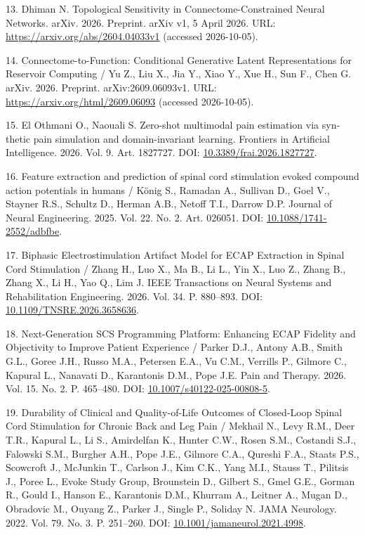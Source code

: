 \documentclass[12pt,a4paper]{article}
\begin{document}
\noindent\foreignlanguage{english}{13. Dhiman N. Topological Sensitivity in Connectome-Constrained Neural Networks. arXiv. 2026. Preprint. arXiv v1, 5 April 2026. URL: \url{https://arxiv.org/abs/2604.04033v1} (accessed 2026-10-05).}\par
\noindent\foreignlanguage{english}{14. Connectome-to-Function: Conditional Generative Latent Representations for Reservoir Computing / Yu Z., Liu X., Jia Y., Xiao Y., Xue H., Sun F., Chen G. arXiv. 2026. Preprint. arXiv:2609.06093v1. URL: \url{https://arxiv.org/html/2609.06093} (accessed 2026-10-05).}\par
\noindent\foreignlanguage{english}{15. El Othmani O., Naouali S. Zero-shot multimodal pain estimation via synthetic pain simulation and domain-invariant learning. Frontiers in Artificial Intelligence. 2026. Vol. 9. Art. 1827727. DOI: \url{10.3389/frai.2026.1827727}.}\par
\noindent\foreignlanguage{english}{16. Feature extraction and prediction of spinal cord stimulation evoked compound action potentials in humans / König S., Ramadan A., Sullivan D., Goel V., Stayner R.S., Schultz D., Herman A.B., Netoff T.I., Darrow D.P. Journal of Neural Engineering. 2025. Vol. 22. No. 2. Art. 026051. DOI: \url{10.1088/1741-2552/adbfbe}.}\par
\noindent\foreignlanguage{english}{17. Biphasic Electrostimulation Artifact Model for ECAP Extraction in Spinal Cord Stimulation / Zhang H., Luo X., Ma B., Li L., Yin X., Luo Z., Zhang B., Zhang X., Li H., Yao Q., Lim J. IEEE Transactions on Neural Systems and Rehabilitation Engineering. 2026. Vol. 34. P. 880–893. DOI: \url{10.1109/TNSRE.2026.3658636}.}\par
\noindent\foreignlanguage{english}{18. Next-Generation SCS Programming Platform: Enhancing ECAP Fidelity and Objectivity to Improve Patient Experience / Parker D.J., Antony A.B., Smith G.L., Goree J.H., Russo M.A., Petersen E.A., Vu C.M., Verrills P., Gilmore C., Kapural L., Nanavati D., Karantonis D.M., Pope J.E. Pain and Therapy. 2026. Vol. 15. No. 2. P. 465–480. DOI: \url{10.1007/s40122-025-00808-5}.}\par
\noindent\foreignlanguage{english}{19. Durability of Clinical and Quality-of-Life Outcomes of Closed-Loop Spinal Cord Stimulation for Chronic Back and Leg Pain / Mekhail N., Levy R.M., Deer T.R., Kapural L., Li S., Amirdelfan K., Hunter C.W., Rosen S.M., Costandi S.J., Falowski S.M., Burgher A.H., Pope J.E., Gilmore C.A., Qureshi F.A., Staats P.S., Scowcroft J., McJunkin T., Carlson J., Kim C.K., Yang M.I., Stauss T., Pilitsis J., Poree L., Evoke Study Group, Brounstein D., Gilbert S., Gmel G.E., Gorman R., Gould I., Hanson E., Karantonis D.M., Khurram A., Leitner A., Mugan D., Obradovic M., Ouyang Z., Parker J., Single P., Soliday N. JAMA Neurology. 2022. Vol. 79. No. 3. P. 251–260. DOI: \url{10.1001/jamaneurol.2021.4998}.}\par
\end{document}
